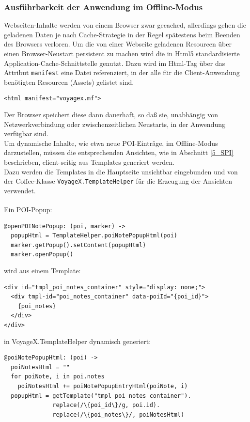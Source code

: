 \subsubsection{Ausführbarkeit der Anwendung im Offline-Modus}
Webseiten-Inhalte werden von einem Browser zwar gecached, allerdings gehen die geladenen Daten je nach Cache-Strategie in der Regel spätestens beim Beenden des Browsers verloren. Um die von einer Webseite geladenen Resourcen über einen Browser-Neustart persistent zu machen wird die in Html5 standardisierte Application-Cache-Schnittstelle genutzt. Dazu wird im Html-Tag über das Attribut \texttt{manifest} eine Datei referenziert, in der alle für die Client-Anwendung benötigten Resourcen (Assets) gelistet sind.
\lstset{language=Html}
\begin{lstlisting}[frame=single,numbers=none,xleftmargin=0pt]
<html manifest="voyagex.mf">
\end{lstlisting}%
Der Browser speichert diese dann dauerhaft, so daß sie, unabhängig von Netzwerkverbindung oder zwischenzeitlichen Neustarts, in der Anwendung verfügbar sind.\\
Um dynamische Inhalte, wie etwa neue POI-Einträge, im Offline-Modus darzustellen, müssen die entsprechenden Ansichten, wie in Abschnitt \ref{5_SPI} beschrieben, client-seitig aus Templates generiert werden.\\
Dazu werden die Templates in die Hauptseite unsichtbar eingebunden und von der Coffee-Klasse  \texttt{VoyageX.TemplateHelper} für die Erzeugung der Ansichten verwendet.\\ \\
Ein POI-Popup:
\lstset{language=Javascript}
\begin{lstlisting}[frame=single,numbers=none,xleftmargin=0pt]
@openPOINotePopup: (poi, marker) ->
  popupHtml = TemplateHelper.poiNotePopupHtml(poi)
  marker.getPopup().setContent(popupHtml)
  marker.openPopup()
\end{lstlisting}%
wird aus einem Template:
\lstset{language=Html}
\begin{lstlisting}[frame=single,numbers=none,xleftmargin=0pt]
<div id="tmpl_poi_notes_container" style="display: none;">
  <div tmpl-id="poi_notes_container" data-poiId="{poi_id}">
    {poi_notes}
  </div>
</div>
\end{lstlisting}%
in VoyageX.TemplateHelper dynamisch generiert:
\lstset{language=Javascript}
\begin{lstlisting}[frame=single,numbers=none,xleftmargin=0pt]
@poiNotePopupHtml: (poi) ->
  poiNotesHtml = ""
  for poiNote, i in poi.notes
    poiNotesHtml += poiNotePopupEntryHtml(poiNote, i)
  popupHtml = getTemplate("tmpl_poi_notes_container").
              replace(/\{poi_id\}/g, poi.id).
              replace(/\{poi_notes\}/, poiNotesHtml)
\end{lstlisting}%


